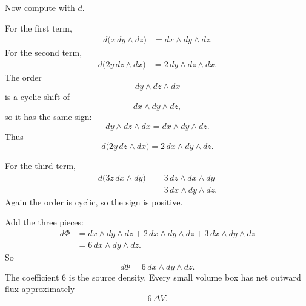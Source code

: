 Now compute with \(d\).

For the first term,
\[
\begin{aligned}
d\bigl(x\,dy\wedge dz\bigr)
&=
dx\wedge dy\wedge dz.
\end{aligned}
\]
For the second term,
\[
\begin{aligned}
d\bigl(2y\,dz\wedge dx\bigr)
&=
2\,dy\wedge dz\wedge dx.
\end{aligned}
\]
The order
\[
    dy\wedge dz\wedge dx
\]
is a cyclic shift of
\[
    dx\wedge dy\wedge dz,
\]
so it has the same sign:
\[
    dy\wedge dz\wedge dx=dx\wedge dy\wedge dz.
\]
Thus
\[
    d\bigl(2y\,dz\wedge dx\bigr)
    =
    2\,dx\wedge dy\wedge dz.
\]

For the third term,
\[
\begin{aligned}
d\bigl(3z\,dx\wedge dy\bigr)
&=
3\,dz\wedge dx\wedge dy\\
&=
3\,dx\wedge dy\wedge dz.
\end{aligned}
\]
Again the order is cyclic, so the sign is positive.

Add the three pieces:
\[
\begin{aligned}
d\Phi
&=
dx\wedge dy\wedge dz
+
2\,dx\wedge dy\wedge dz
+
3\,dx\wedge dy\wedge dz\\
&=
6\,dx\wedge dy\wedge dz.
\end{aligned}
\]
So
\[
\boxed{
    d\Phi=6\,dx\wedge dy\wedge dz.
}
\]
The coefficient \(6\) is the source density.  Every small volume box has net outward
flux approximately
\[
    6\,\Delta V.
\]

